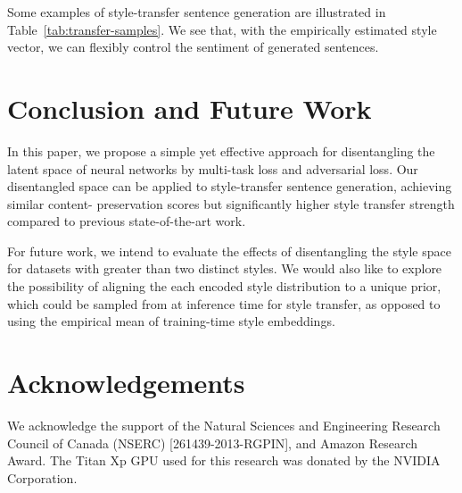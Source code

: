 \documentclass[11pt,a4paper]{article}
\begin{document}
Some examples of style-transfer sentence generation are illustrated in Table~\ref{tab:transfer-samples}. We see that, with the empirically estimated style vector, we can flexibly control the sentiment of generated sentences.


\section{Conclusion and Future Work}
In this paper, we propose a simple yet effective approach for disentangling the latent space of neural networks by multi-task loss and adversarial loss. Our disentangled space can be applied to style-transfer sentence generation, achieving similar content- preservation scores but significantly higher style transfer strength compared to previous state-of-the-art work.

For future work, we intend to evaluate the effects of disentangling the style space for datasets with greater than two distinct styles. We would also like to explore the possibility of aligning the each encoded style distribution to a unique prior, which could be sampled from at inference time for style transfer, as opposed to using the empirical mean of training-time style embeddings.

\section{Acknowledgements}
We acknowledge the support of the Natural Sciences and Engineering Research Council of Canada (NSERC) [261439-2013-RGPIN], and Amazon Research Award. The Titan Xp GPU used for this research was donated by the NVIDIA Corporation.




\end{document}
